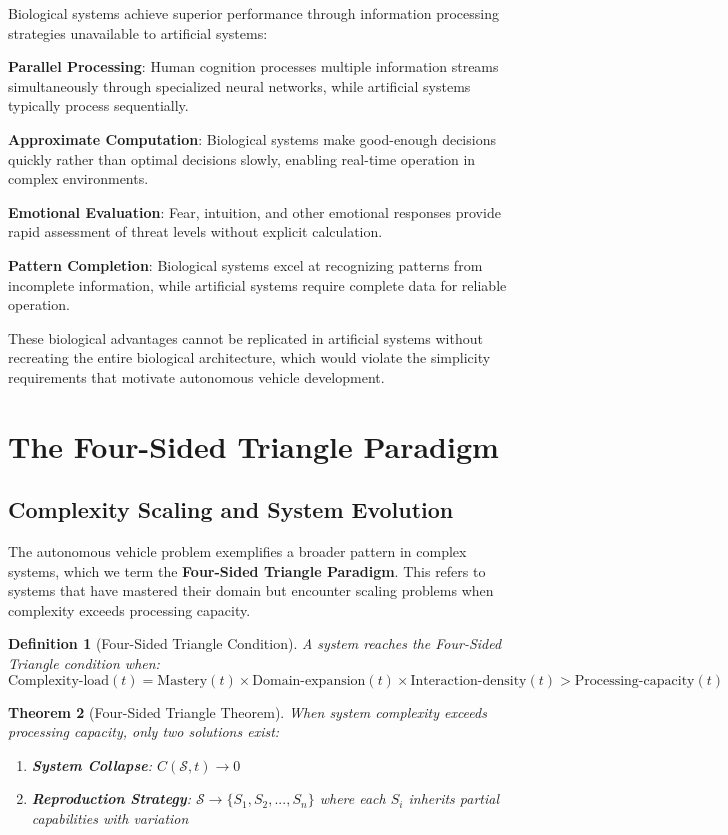\documentclass[12pt,a4paper]{article}
\newtheorem{theorem}{Theorem}[section]
\newtheorem{definition}[theorem]{Definition}
\begin{document}
Biological systems achieve superior performance through information processing strategies unavailable to artificial systems:

\textbf{Parallel Processing}: Human cognition processes multiple information streams simultaneously through specialized neural networks, while artificial systems typically process sequentially.

\textbf{Approximate Computation}: Biological systems make good-enough decisions quickly rather than optimal decisions slowly, enabling real-time operation in complex environments.

\textbf{Emotional Evaluation}: Fear, intuition, and other emotional responses provide rapid assessment of threat levels without explicit calculation.

\textbf{Pattern Completion}: Biological systems excel at recognizing patterns from incomplete information, while artificial systems require complete data for reliable operation.

These biological advantages cannot be replicated in artificial systems without recreating the entire biological architecture, which would violate the simplicity requirements that motivate autonomous vehicle development.

\section{The Four-Sided Triangle Paradigm}

\subsection{Complexity Scaling and System Evolution}

The autonomous vehicle problem exemplifies a broader pattern in complex systems, which we term the \textbf{Four-Sided Triangle Paradigm}. This refers to systems that have mastered their domain but encounter scaling problems when complexity exceeds processing capacity.

\begin{definition}[Four-Sided Triangle Condition]
A system reaches the Four-Sided Triangle condition when:
$$\text{Complexity-load}(t) = \text{Mastery}(t) \times \text{Domain-expansion}(t) \times \text{Interaction-density}(t) > \text{Processing-capacity}(t)$$
\end{definition}

\begin{theorem}[Four-Sided Triangle Theorem]
When system complexity exceeds processing capacity, only two solutions exist:
\begin{enumerate}
\item \textbf{System Collapse}: $C(\mathcal{S}, t) \rightarrow 0$
\item \textbf{Reproduction Strategy}: $\mathcal{S} \rightarrow \{S_1, S_2, ..., S_n\}$ where each $S_i$ inherits partial capabilities with variation
\end{enumerate}
\end{theorem}
\end{document}
